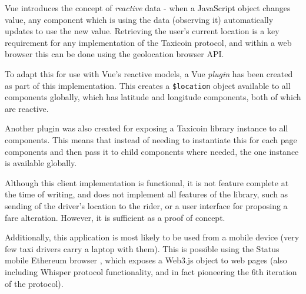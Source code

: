 Vue introduces the concept of \textit{reactive} data - when a JavaScript object changes value, any component which is using the data (observing it) automatically updates to use the new value. Retrieving the user's current location is a key requirement for any implementation of the Taxicoin protocol, and within a web browser this can be done using the geolocation browser API.

To adapt this for use with Vue's reactive models, a Vue \textit{plugin} has been created as part of this implementation. This creates a \lstinline{$location} object available to all components globally, which has latitude and longitude components, both of which are reactive.

Another plugin was also created for exposing a Taxicoin library instance to all components. This means that instead of needing to instantiate this for each page components and then pass it to child components where needed, the one instance is available globally.

Although this client implementation is functional, it is not feature complete at the time of writing, and does not implement all features of the library, such as sending of the driver's location to the rider, or a user interface for proposing a fare alteration. However, it is sufficient as a proof of concept.

Additionally, this application is most likely to be used from a mobile device (very few taxi drivers carry a laptop with them). This is possible using the Status mobile Ethereum browser \cite{Status.im}, which exposes a Web3.js object to web pages (also including Whisper protocol functionality, and in fact pioneering the 6th iteration of the protocol).
